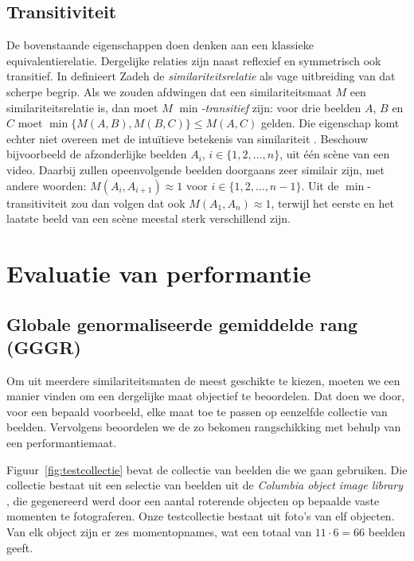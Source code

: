 \subsection{Transitiviteit}

De bovenstaande eigenschappen doen denken aan een klassieke equivalentierelatie. Dergelijke
relaties zijn naast reflexief en symmetrisch ook transitief. In 
\cite{zadeh:similarity_relations_and_fuzzy_orderings} definieert Zadeh
de \emph{similariteitsrelatie} als vage uitbreiding van dat scherpe begrip. Als we zouden
afdwingen dat een similariteitsmaat $M$ een similariteitsrelatie is, dan moet $M$ 
\emph{$\min$-transitief} zijn: voor drie beelden $A$, $B$ en $C$ moet 
$\min\{M(A,B),M(B,C)\} \le M(A,C)$ gelden. Die
eigenschap komt echter niet overeen met de intu\"itieve betekenis van similariteit
\cite{de_cock:on_unsuitable_relations_for_approx_equal, de_cock:why_fuzzy_relations_do_not_resolve_pointcare_paradox}. 
Beschouw bijvoorbeeld de afzonderlijke beelden $A_i$, $i \in \{1,2,\ldots,n\}$, uit \'e\'en sc\`ene van een video. 
Daarbij zullen opeenvolgende beelden doorgaans zeer similair zijn, met andere woorden: 
$M(A_i,A_{i+1}) \approx 1$ voor $i \in \{1,2,\ldots,n-1\}$. Uit de $\min$-transitiviteit
zou dan volgen dat ook $M(A_1,A_n) \approx 1$, terwijl het eerste en het laatste beeld
van een sc\`ene meestal sterk verschillend zijn.   

\section{Evaluatie van performantie}

\subsection{Globale genormaliseerde gemiddelde rang (GGGR)}

Om uit meerdere similariteitsmaten de meest geschikte te kiezen, 
moeten we een manier vinden om een dergelijke maat objectief te beoordelen. 
Dat doen we door, voor een bepaald voorbeeld, elke maat toe te passen op eenzelfde collectie 
van beelden. Vervolgens beoordelen we de zo bekomen rangschikking met behulp van een performantiemaat.

Figuur~\ref{fig:testcollectie} bevat de collectie van beelden die we gaan 
gebruiken. Die collectie bestaat uit een selectie van beelden uit
de \emph{Columbia object image library} \cite{coil-100}, die gegenereerd werd 
door een aantal roterende objecten op bepaalde vaste momenten te fotograferen. 
Onze testcollectie bestaat uit foto's van elf objecten. Van elk object zijn
er zes momentopnames, wat een totaal van $11 \cdot 6 = 66$ beelden geeft.

